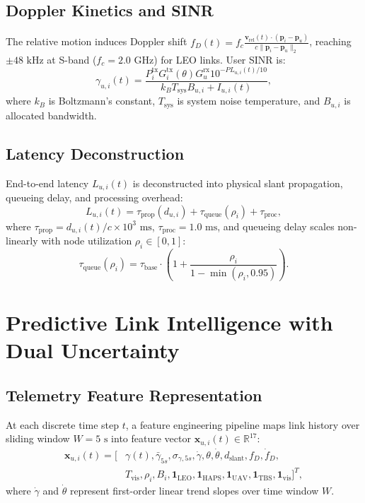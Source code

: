 \documentclass[conference]{IEEEtran}
\begin{document}
\subsection{Doppler Kinetics and SINR}
The relative motion induces Doppler shift $f_D(t) = f_c \frac{\mathbf{v}_{\text{rel}}(t) \cdot (\mathbf{p}_i - \mathbf{p}_u)}{c \|\mathbf{p}_i - \mathbf{p}_u\|_2}$, reaching $\pm 48\text{ kHz}$ at S-band ($f_c = 2.0\text{ GHz}$) for LEO links. User SINR is:
\begin{equation}
\gamma_{u,i}(t) = \frac{P_i^{\text{tx}} G_i^{\text{tx}}(\theta) G_u^{\text{rx}} 10^{-PL_{u,i}(t)/10}}{k_B T_{\text{sys}} B_{u,i} + I_{u,i}(t)},
\end{equation}
where $k_B$ is Boltzmann's constant, $T_{\text{sys}}$ is system noise temperature, and $B_{u,i}$ is allocated bandwidth.

\subsection{Latency Deconstruction}
End-to-end latency $L_{u,i}(t)$ is deconstructed into physical slant propagation, queueing delay, and processing overhead:
\begin{equation}
L_{u,i}(t) = \tau_{\text{prop}}(d_{u,i}) + \tau_{\text{queue}}(\rho_i) + \tau_{\text{proc}},
\end{equation}
where $\tau_{\text{prop}} = d_{u,i}(t)/c \times 10^3\text{ ms}$, $\tau_{\text{proc}} = 1.0\text{ ms}$, and queueing delay scales non-linearly with node utilization $\rho_i \in [0, 1]$:
\begin{equation}
\tau_{\text{queue}}(\rho_i) = \tau_{\text{base}} \cdot \left(1 + \frac{\rho_i}{1 - \min(\rho_i, 0.95)}\right).
\end{equation}

\section{Predictive Link Intelligence with Dual Uncertainty}
\label{sec:prediction_engine}

\subsection{Telemetry Feature Representation}
At each discrete time step $t$, a feature engineering pipeline maps link history over sliding window $W = 5\text{ s}$ into feature vector $\mathbf{x}_{u,i}(t) \in \mathbb{R}^{17}$:
\begin{align}
\mathbf{x}_{u,i}(t) = [&\gamma(t), \bar{\gamma}_{5s}, \sigma_{\gamma, 5s}, \dot{\gamma}, \theta, \dot{\theta}, d_{\text{slant}}, f_D, \dot{f}_D, \nonumber \\
&T_{\text{vis}}, \rho_i, B_i, \mathbf{1}_{\text{LEO}}, \mathbf{1}_{\text{HAPS}}, \mathbf{1}_{\text{UAV}}, \mathbf{1}_{\text{TBS}}, \mathbf{1}_{\text{vis}}]^T,
\end{align}
where $\dot{\gamma}$ and $\dot{\theta}$ represent first-order linear trend slopes over time window $W$.
\end{document}

